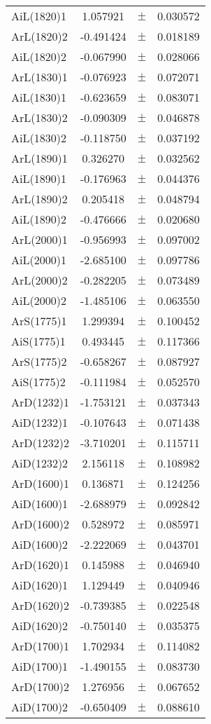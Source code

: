 \begin{table}
\begin{tiny}
\begin{tabular}{lccc}
AiL(1820)1 & 1.057921 & $\pm$ & 0.030572 \\
ArL(1820)2 & -0.491424 & $\pm$ & 0.018189 \\
AiL(1820)2 & -0.067990 & $\pm$ & 0.028066 \\
ArL(1830)1 & -0.076923 & $\pm$ & 0.072071 \\
AiL(1830)1 & -0.623659 & $\pm$ & 0.083071 \\
ArL(1830)2 & -0.090309 & $\pm$ & 0.046878 \\
AiL(1830)2 & -0.118750 & $\pm$ & 0.037192 \\
ArL(1890)1 & 0.326270 & $\pm$ & 0.032562 \\
AiL(1890)1 & -0.176963 & $\pm$ & 0.044376 \\
ArL(1890)2 & 0.205418 & $\pm$ & 0.048794 \\
AiL(1890)2 & -0.476666 & $\pm$ & 0.020680 \\
ArL(2000)1 & -0.956993 & $\pm$ & 0.097002 \\
AiL(2000)1 & -2.685100 & $\pm$ & 0.097786 \\
ArL(2000)2 & -0.282205 & $\pm$ & 0.073489 \\
AiL(2000)2 & -1.485106 & $\pm$ & 0.063550 \\
ArS(1775)1 & 1.299394 & $\pm$ & 0.100452 \\
AiS(1775)1 & 0.493445 & $\pm$ & 0.117366 \\
ArS(1775)2 & -0.658267 & $\pm$ & 0.087927 \\
AiS(1775)2 & -0.111984 & $\pm$ & 0.052570 \\
ArD(1232)1 & -1.753121 & $\pm$ & 0.037343 \\
AiD(1232)1 & -0.107643 & $\pm$ & 0.071438 \\
ArD(1232)2 & -3.710201 & $\pm$ & 0.115711 \\
AiD(1232)2 & 2.156118 & $\pm$ & 0.108982 \\
ArD(1600)1 & 0.136871 & $\pm$ & 0.124256 \\
AiD(1600)1 & -2.688979 & $\pm$ & 0.092842 \\
ArD(1600)2 & 0.528972 & $\pm$ & 0.085971 \\
AiD(1600)2 & -2.222069 & $\pm$ & 0.043701 \\
ArD(1620)1 & 0.145988 & $\pm$ & 0.046940 \\
AiD(1620)1 & 1.129449 & $\pm$ & 0.040946 \\
ArD(1620)2 & -0.739385 & $\pm$ & 0.022548 \\
AiD(1620)2 & -0.750140 & $\pm$ & 0.035375 \\
ArD(1700)1 & 1.702934 & $\pm$ & 0.114082 \\
AiD(1700)1 & -1.490155 & $\pm$ & 0.083730 \\
ArD(1700)2 & 1.276956 & $\pm$ & 0.067652 \\
AiD(1700)2 & -0.650409 & $\pm$ & 0.088610 \\
\bottomrule
\end{tabular}
\end{tiny}
\end{table}

